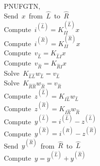   

\begin{center}
\begin{pseudocode}[doublebox]{PNUFGT}{N, \delta}
\label{alg:pnufgt}
 \\
\mbox{Send $x$ from $\widehat{L}$ to $\widehat{R}$} \\
\mbox{Compute $i^{(\widehat{L})} = K_{II}^{(\widehat{L})} x$} \\
\mbox{Compute $i^{(\widehat{R})} = K_{II}^{(\widehat{R})} x$} \\
\mbox{Compute $v_{\widehat{L}} = K_{\widehat{L}I} x$} \\
\mbox{Compute $v_{\widehat{R}} = K_{\widehat{R}I} x$} \\
\mbox{Solve $K_{\widehat{L}\widehat{L}} w_{\widehat{L}} = v_{\widehat{L}}$} \\
\mbox{Solve $K_{\widehat{R}\widehat{R}} w_{\widehat{R}} = v_{\widehat{R}}$} \\
\mbox{Compute $z^{(\widehat{L})} = K_{I\widehat{L}} w_{\widehat{L}}$} \\
\mbox{Compute $z^{(\widehat{R})} = K_{I\widehat{R}} w_{\widehat{R}}$} \\
\mbox{Compute $y^{(\widehat{L})} = i^{(\widehat{L})} - z^{(\widehat{L})}$} \\
\mbox{Compute $y^{(\widehat{R})} = i^{(\widehat{R})} - z^{(\widehat{R})}$} \\
\mbox{Send $y^{(\widehat{R})}$ from $\widehat{R}$ to $\widehat{L}$} \\
\mbox{Compute $y = y^{(\widehat{L})} + y^{(\widehat{R})}$} \\
\end{pseudocode}
\end{center}